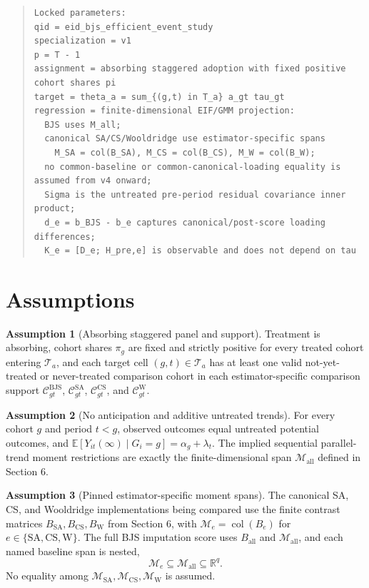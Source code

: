 \documentclass[11pt]{article}
\newcommand{\E}{\mathbb{E}}
\newcommand{\R}{\mathbb{R}}
\theoremstyle{definition}
\newtheorem{assumption}{Assumption}
\theoremstyle{plain}
\theoremstyle{remark}
\begin{document}
\begin{quote}\small
\begin{verbatim}
Locked parameters:
qid = eid_bjs_efficient_event_study
specialization = v1
p = T - 1
assignment = absorbing staggered adoption with fixed positive cohort shares pi
target = theta_a = sum_{(g,t) in T_a} a_gt tau_gt
regression = finite-dimensional EIF/GMM projection:
  BJS uses M_all;
  canonical SA/CS/Wooldridge use estimator-specific spans
    M_SA = col(B_SA), M_CS = col(B_CS), M_W = col(B_W);
  no common-baseline or common-canonical-loading equality is assumed from v4 onward;
  Sigma is the untreated pre-period residual covariance inner product;
  d_e = b_BJS - b_e captures canonical/post-score loading differences;
  K_e = [D_e; H_pre,e] is observable and does not depend on tau
\end{verbatim}
\end{quote}

\section{Assumptions}
\begin{assumption}[Absorbing staggered panel and support]\label{ass:panel-support}
Treatment is absorbing, cohort shares \(\pi_g\) are fixed and strictly positive
for every treated cohort entering \(\mathcal T_a\), and each target cell
\((g,t)\in\mathcal T_a\) has at least one valid not-yet-treated or
never-treated comparison cohort in each estimator-specific comparison support
\(\mathcal C^{\mathrm{BJS}}_{gt}\), \(\mathcal C^{\mathrm{SA}}_{gt}\),
\(\mathcal C^{\mathrm{CS}}_{gt}\), and \(\mathcal C^{\mathrm{W}}_{gt}\).
\end{assumption}

\begin{assumption}[No anticipation and additive untreated trends]\label{ass:pt-na}
For every cohort \(g\) and period \(t<g\), observed outcomes equal untreated
potential outcomes, and
\(\E[Y_{it}(\infty)\mid G_i=g]=\alpha_g+\lambda_t\).  The implied sequential
parallel-trend moment restrictions are exactly the finite-dimensional span
\(\mathcal M_{\mathrm{all}}\) defined in Section 6.
\end{assumption}

\begin{assumption}[Pinned estimator-specific moment spans]\label{ass:nested-moments}
The canonical SA, CS, and Wooldridge implementations being compared use the
finite contrast matrices \(B_{\mathrm{SA}},B_{\mathrm{CS}},B_{\mathrm{W}}\)
from Section 6, with
\(\mathcal M_e=\operatorname{col}(B_e)\) for
\(e\in\{\mathrm{SA},\mathrm{CS},\mathrm{W}\}\).  The full BJS imputation score
uses \(B_{\mathrm{all}}\) and \(\mathcal M_{\mathrm{all}}\), and each named
baseline span is nested,
\[
  \mathcal M_e\subseteq\mathcal M_{\mathrm{all}}\subseteq\R^q.
\]
No equality among
\(\mathcal M_{\mathrm{SA}},\mathcal M_{\mathrm{CS}},\mathcal M_{\mathrm{W}}\)
is assumed.
\end{assumption}
\end{document}
